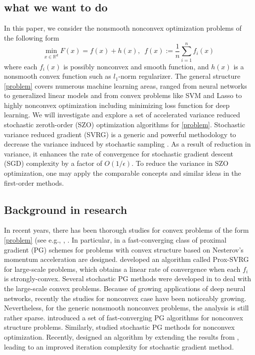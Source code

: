 \documentclass{article}
\newcommand*{\R}{\mathbb{R}}
\theoremstyle{definition}
\theoremstyle{remark}
\begin{document}
\subsection{what we want to do}
In this paper, we consider the nonsmooth nonconvex optimization problems of the following form
\begin{equation}\label{problem}
\min_{x\in\R^d} F(x) =  f(x) + h(x),\,\,\,f(x):=\frac{1}{n}\sum_{i=1}^n f_i(x)
\end{equation}
where each $f_i(x)$ is possibly nonconvex and smooth function, and $h(x)$ is a nonsmooth convex function such as $l_1$-norm regularizer. 
The general structure \eqref{problem} covers
numerous machine learning areas, ranged from neural networks to  generalized linear models  
 and from convex problems like  SVM  and Lasso to highly nonconvex optimization including minimizing loss function for deep learning. We will investigate and explore a set of accelerated variance reduced stochastic zeroth-order (SZO) optimization algorithms for \eqref{problem}. Stochastic variance reduced gradient
(SVRG) is a generic and powerful methodology to decrease the variance induced by stochastic sampling \cite{johnson2013accelerating,reddi2016stochastic,nitanda2016accelerated,allen2016improved,lei2017non}. As a result of reduction in variance, it enhances the rate of convergence for stochastic gradient descent (SGD) complexity by a factor of $O(1/{\epsilon})$. To reduce the variance in SZO optimization, one may apply the comparable concepts and similar ideas in the first-order methods. 
\subsection{Background in research}
In recent years, there has been thorough studies for convex problems of the form \eqref{problem} (see e.g., \cite{nesterov2013gradient}, \cite{xiao2014proximal,defazio2014saga,lan2017optimal,allen2017katyusha}. 
In particular, in \cite{beck2009fast} a fast-converging class of proximal gradient (PG) schemes for problems with convex structure based on Nesterov's momentum acceleration are designed.  
\cite{xiao2014proximal} developed an algorithm called Prox-SVRG for large-scale problems, which
obtains a linear rate of convergence when each  $f_i$ is strongly-convex. Several stochastic PG methods were developed in \cite{bertsekas2011incremental,xiao2014proximal}  to deal with the large-scale convex problems. Because of growing applications of deep neural networks, recently the studies for nonconvex case have been noticeably growing. Nevertheless, for the generic nonsmooth nonconvex problems, the analysis is still rather sparse.  \cite{li2015accelerated} introduced a set of fast-converging PG algorithms for nonconvex structure problems. Similarly, \cite{ghadimi2016accelerated,reddi2016proximal} studied stochastic PG methods for nonconvex optimization.
Recently, \cite{li2018simple} designed an algorithm by extending the results from \cite{reddi2016proximal}, leading to an improved iteration complexity for stochastic gradient method. 
\end{document}
